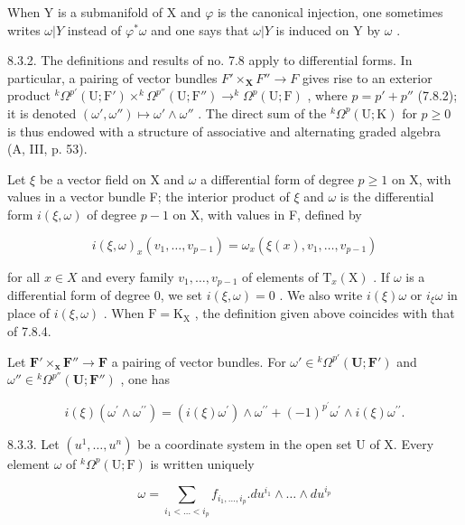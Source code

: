 When Y is a submanifold of X and \(\varphi\) is the canonical injection, one sometimes writes \(\omega|Y\) instead of \(\varphi^{*}\omega\) and one says that \(\omega|Y\) is induced on Y by \(\omega\) .

8.3.2. The definitions and results of no. 7.8 apply to differential forms. In particular, a pairing of vector bundles \(F' \times_{\mathbf{X}} F'' \to F\) gives rise to an exterior product \(^k\Omega^{p'}(\mathrm{U};\mathrm{F}') \times ^k\Omega^{p''}(\mathrm{U};\mathrm{F}'') \to ^k\Omega^p(\mathrm{U};\mathrm{F})\) , where \(p = p' + p''\) (7.8.2); it is denoted \((\omega', \omega'') \mapsto \omega' \wedge \omega''\) . The direct sum of the \(^k\Omega^p(\mathrm{U};\mathrm{K})\) for \(p \geqslant 0\) is thus endowed with a structure of associative and alternating graded algebra (A, III, p. 53).

Let \(\xi\) be a vector field on X and \(\omega\) a differential form of degree \(p \geqslant 1\) on X, with values in a vector bundle F; the interior product of \(\xi\) and \(\omega\) is the differential form \(i(\xi, \omega)\) of degree \(p - 1\) on X, with values in F, defined by

\[
i (\xi , \omega) _ {x} (v _ {1}, \dots , v _ {p - 1}) = \omega_ {x} (\xi (x), v _ {1}, \dots , v _ {p - 1})\tag{3}
\]

for all \(x \in X\) and every family \(v_{1}, \ldots, v_{p-1}\) of elements of \(\mathrm{T}_{x}(\mathrm{X})\) . If \(\omega\) is a differential form of degree 0, we set \(i(\xi, \omega) = 0\) . We also write \(i(\xi)\omega\) or \(i_{\xi}\omega\) in place of \(i(\xi, \omega)\) . When \(\mathrm{F} = \mathrm{K}_{\mathrm{X}}\) , the definition given above coincides with that of 7.8.4.

Let \(\mathbf{F}' \times_{\mathbf{x}} \mathbf{F}'' \to \mathbf{F}\) a pairing of vector bundles. For \(\omega' \in {}^k \Omega^{p'}(\mathbf{U}; \mathbf{F}')\) and \(\omega'' \in {}^k \Omega^{p''}(\mathbf{U}; \mathbf{F}'')\) , one has

\[
i (\xi) \left(\omega^ {\prime} \wedge \omega^ {\prime \prime}\right) = \left(i (\xi) \omega^ {\prime}\right) \wedge \omega^ {\prime \prime} + (- 1) ^ {p ^ {\prime}} \omega^ {\prime} \wedge i (\xi) \omega^ {\prime \prime}.\tag{4}
\]

8.3.3. Let \((u^{1},\ldots,u^{n})\) be a coordinate system in the open set U of X. Every element \(\omega\) of \({}^{k}\Omega^{p}(\mathrm{U};\mathrm{F})\) is written uniquely

\[
\omega = \sum_ {i _ {1} <   \dots <   i _ {p}} f _ {i _ {1}, \dots , i _ {p}}. d u ^ {i _ {1}} \wedge \dots \wedge d u ^ {i _ {p}}
\]

